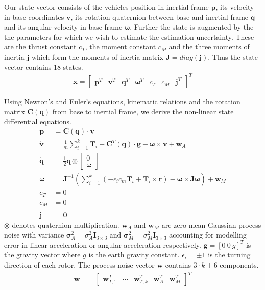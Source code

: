 \documentclass[10pt,a4paper]{article}
\begin{document}
Our state vector consists of the vehicles position in inertial frame $\mathbf{p}$, its velocity in base coordinates $\mathbf{v}$, its rotation quaternion between base and inertial frame $\mathbf{q}$ and its angular velocity in base frame $\boldsymbol{\omega}$. Further the state is augmented by the the parameters for which we wish to estimate the estimation uncertainty. These are the thrust constant $c_T$, the moment constant $c_M$ and the three moments of inertia $\mathbf{j}$ which form the moments of inertia matrix $\mathbf{J} = diag(\mathbf{j})$. Thus the state vector contains $18$ states.
\begin{align}
\mathbf{x} = \begin{bmatrix}
\mathbf{p}^T & \mathbf{v}^T & \mathbf{q}^T & \boldsymbol{\omega}^T & c_T & c_M & \mathbf{j}^T
\end{bmatrix} ^T
\end{align}

Using Newton's and Euler's equations, kinematic relations and the rotation matrix $\mathbf{C}(\mathbf{q})$ from base to inertial frame, we derive the non-linear state differential equations.
\begin{subequations}
\label{eq:model}
\begin{align}
\dot{\mathbf{p}} &= \mathbf{C}(\mathbf{q}) \cdot \mathbf{v} \\
\dot{\mathbf{v}} &= \frac{1}{m} \sum_{i=1}^k \mathbf{T}_i - \mathbf{C}^T(\mathbf{q}) \cdot \mathbf{g} - \boldsymbol{\omega} \times \mathbf{v} + \mathbf{w}_A \\
\dot{\mathbf{q}} &= \frac{1}{2} \mathbf{q} \otimes \begin{bmatrix}
0 \\ \boldsymbol{\omega}
\end{bmatrix} \\
\dot{\boldsymbol{\omega}} &= \mathbf{J}^{-1} \left(  \sum_{i=1}^k \left(-\epsilon_i  c_m \mathbf{T}_i + \mathbf{T}_i \times \mathbf{r} \right) - \boldsymbol{\omega} \times \mathbf{J} \boldsymbol{\omega} \right) + \mathbf{w}_M \\
\dot{c}_T &= 0 \\
\dot{c}_M &= 0 \\
\dot{\mathbf{j}} &= \mathbf{0}
\end{align}
\end{subequations}
$\otimes$ denotes quaternion multiplication. $\mathbf{w}_A$ and $\mathbf{w}_M$ are zero mean Gaussian process noise with variance $\boldsymbol{\sigma}_A^2 = \sigma_A^2 \mathbf{I}_{3\times3}$ and $\boldsymbol{\sigma}_M^2 = \sigma_M^2 \mathbf{I}_{3\times3}$ accounting for modelling error in linear acceleration or angular acceleration respectively. $\mathbf{g} = [0~0~g]^T$ is the gravity vector where $g$ is the earth gravity constant. $\epsilon_i = \pm 1$ is the turning direction of each rotor. The process noise vector $\mathbf{w}$ contains $3 \cdot k + 6$ components.
\begin{align}
\mathbf{w} &= \begin{bmatrix}
\mathbf{w}_{T,1}^T & \cdots & \mathbf{w}_{T,k}^T & \mathbf{w}_A^T & \mathbf{w}_M^T 
\end{bmatrix}^T
\end{align}
\end{document}
